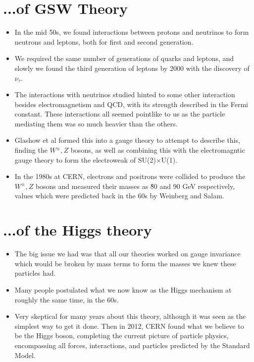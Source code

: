 \documentclass[relqm.tex]{subfiles}
\begin{document}
\section{...of GSW Theory}
\begin{itemize}
    \item In the mid 50s, we found interactions between protons and neutrinos to form neutrons and leptons, both for first and second generation.
    \item We required the same number of generations of quarks and leptons, and slowly we found the third generation of leptons by 2000 with the discovery of $\nu_\tau$.
    \item The interactions with neutrinos studied hinted to some other interaction besides electromagnetism and QCD, with its strength described in the Fermi constant. 
        These interactions all seemed pointlike to us as the particle mediating them was so much heavier than the others. 
    \item Glashow et al formed this into a gauge theory to attempt to describe this, finding the $W^\pm,Z$ bosons, as well as combining this with the electromagntic gauge theory to form the electroweak of SU(2)$\times$U(1).
    \item In the 1980s at CERN, electrons and positrons were collided to produce the $W^\pm,Z$ bosons and measured their masses as \~80 and 90 GeV respectively, values which were predicted back in the 60s by Weinberg and Salam.
\end{itemize}

\section{...of the Higgs theory}
\begin{itemize}
    \item The big issue we had was that all our theories worked on gauge invariance which would be broken by mass terms to form the masses we knew these particles had. 
    \item Many people postulated what we now know as the Higgs mechanism at roughly the same time, in the 60s. 
    \item Very skeptical for many years about this theory, although it was seen as the simplest way to get it done. 
        Then in 2012, CERN found what we believe to be the Higgs boson, completing the current picture of particle physics, encompassing all forces, interactions, and particles predicted by the Standard Model.
\end{itemize}
\end{document}
